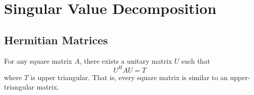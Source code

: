 \chapter{Singular Value Decomposition}


\section{Hermitian Matrices}

\begin{lemma}
For any square matrix $A$, there exists a unitary matrix $U$ such that
\begin{equation*}
U^H A U = T
\end{equation*}
where $T$ is upper triangular.
That is, every square matrix is similar to an upper-triangular matrix.
\end{lemma}

